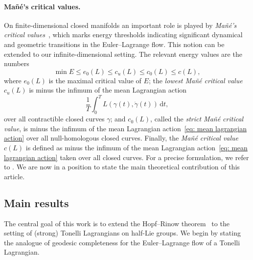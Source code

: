 \documentclass[11pt,reqno]{amsart}
\theoremstyle{plain}
\theoremstyle{definition}
\theoremstyle{plain} %
\theoremstyle{definition} %
\numberwithin{equation}{section}
\def\d{\delta}
\def\d{\delta}
\def\d{{\mathrm{d}}}
\begin{document}
\paragraph{\textbf{Mañé's critical values.}} On finite-dimensional closed manifolds an important role is played by \emph{Mañé’s critical values}~\cite{CIPP, Man}, which marks energy thresholds indicating significant dynamical and geometric transitions in the Euler--Lagrange flow. This notion can be extended to our infinite-dimensional setting. The relevant energy values are the numbers
\[
\min E \le e_0(L) \le c_u(L) \le c_0(L) \leq c(L),
\]
where \( e_0(L) \) is the maximal critical value of \( E \); 
the \emph{lowest Mañé critical value} \( c_u(L) \) is minus the infimum of the mean Lagrangian action
\begin{equation}\label{eq: mean lagrangian action}
    \frac{1}{T} \int_0^T L(\gamma(t), \dot{\gamma}(t))\,\d t,
\end{equation}
over all contractible closed curves \( \gamma \); 
and \( c_0(L) \), called the \emph{strict Mañé critical value}, is minus the infimum of the mean Lagrangian action~\eqref{eq: mean lagrangian action}
over all null-homologous closed curves. 
Finally, the \emph{Mañé critical value} $c(L)$ is defined as minus the infimum 
of the mean Lagrangian action~\eqref{eq: mean lagrangian action} taken over all closed curves. 
For a precise formulation, we refer to . 
We are now in a position to state the main theoretical contribution of this article.

\subsection{Main results} The central goal of this work is to extend the Hopf–Rinow theorem~\cite[Thm.~7.7]{Bauer_2025} to the setting of (strong) Tonelli Lagrangians on half-Lie groups. We begin by stating the analogue of geodesic completeness for the Euler--Lagrange flow of a Tonelli Lagrangian.
\end{document}
